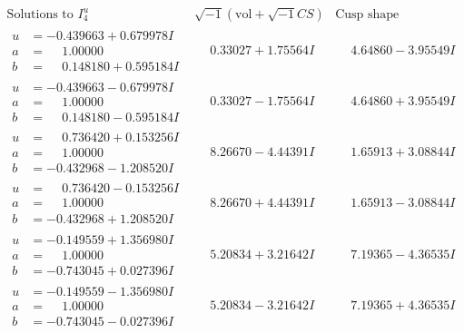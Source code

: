\documentclass[1p]{elsarticle_modified}
\theoremstyle{definition}
\newcommand{\I}{\sqrt{-1}}
\begin{document}
$$\begin{array}{c|c|c}  
\text{Solutions to }I^u_{4}& \I (\text{vol} + \sqrt{-1}CS) & \text{Cusp shape}\\
 \hline 
\begin{aligned}
u &= -0.439663 + 0.679978 I \\
a &= \phantom{-}1.00000\phantom{ +0.000000I} \\
b &= \phantom{-}0.148180 + 0.595184 I\end{aligned}
 & \phantom{-}0.33027 + 1.75564 I & \phantom{-}4.64860 - 3.95549 I \\ \hline\begin{aligned}
u &= -0.439663 - 0.679978 I \\
a &= \phantom{-}1.00000\phantom{ +0.000000I} \\
b &= \phantom{-}0.148180 - 0.595184 I\end{aligned}
 & \phantom{-}0.33027 - 1.75564 I & \phantom{-}4.64860 + 3.95549 I \\ \hline\begin{aligned}
u &= \phantom{-}0.736420 + 0.153256 I \\
a &= \phantom{-}1.00000\phantom{ +0.000000I} \\
b &= -0.432968 - 1.208520 I\end{aligned}
 & \phantom{-}8.26670 - 4.44391 I & \phantom{-}1.65913 + 3.08844 I \\ \hline\begin{aligned}
u &= \phantom{-}0.736420 - 0.153256 I \\
a &= \phantom{-}1.00000\phantom{ +0.000000I} \\
b &= -0.432968 + 1.208520 I\end{aligned}
 & \phantom{-}8.26670 + 4.44391 I & \phantom{-}1.65913 - 3.08844 I \\ \hline\begin{aligned}
u &= -0.149559 + 1.356980 I \\
a &= \phantom{-}1.00000\phantom{ +0.000000I} \\
b &= -0.743045 + 0.027396 I\end{aligned}
 & \phantom{-}5.20834 + 3.21642 I & \phantom{-}7.19365 - 4.36535 I \\ \hline\begin{aligned}
u &= -0.149559 - 1.356980 I \\
a &= \phantom{-}1.00000\phantom{ +0.000000I} \\
b &= -0.743045 - 0.027396 I\end{aligned}
 & \phantom{-}5.20834 - 3.21642 I & \phantom{-}7.19365 + 4.36535 I \\ \hline\begin{aligned}

\end{aligned}
\end{array}$$
\end{document}
